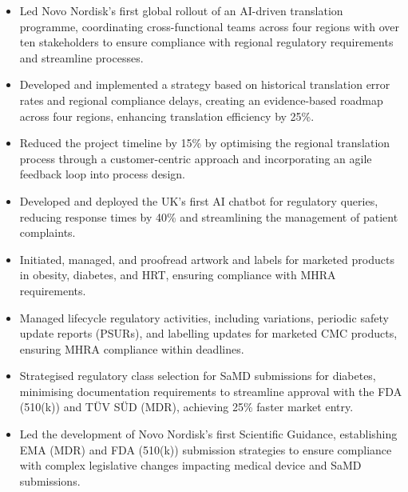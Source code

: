\documentclass[a4paper]{deedy-resume} %
\begin{document}
\begin{itemize} 
    \item Led Novo Nordisk's first global rollout of an AI-driven translation programme, coordinating cross-functional teams across four regions with over ten stakeholders to ensure compliance with regional regulatory requirements and streamline processes. 
    \item Developed and implemented a strategy based on historical translation error rates and regional compliance delays, creating an evidence-based roadmap across four regions, enhancing translation efficiency by 25\%. 
    \item Reduced the project timeline by 15\% by optimising the regional translation process through a customer-centric approach and incorporating an agile feedback loop into process design.
\end{itemize}

\begin{itemize} 
    \item Developed and deployed the UK's first AI chatbot for regulatory queries, reducing response times by 40\% and streamlining the management of patient complaints. 
    \item Initiated, managed, and proofread artwork and labels for marketed products in obesity, diabetes, and HRT, ensuring compliance with MHRA requirements. 
    \item Managed lifecycle regulatory activities, including variations, periodic safety update reports (PSURs), and labelling updates for marketed CMC products, ensuring MHRA compliance within deadlines.
\end{itemize}

\begin{itemize} 
    \item Strategised regulatory class selection for SaMD submissions for diabetes, minimising documentation requirements to streamline approval with the FDA (510(k)) and T\"UV S\"UD (MDR), achieving 25\% faster market entry. 
    \item Led the development of Novo Nordisk's first Scientific Guidance, establishing EMA (MDR) and FDA (510(k)) submission strategies to ensure compliance with complex legislative changes impacting medical device and SaMD submissions.
\end{itemize}
\end{document}
